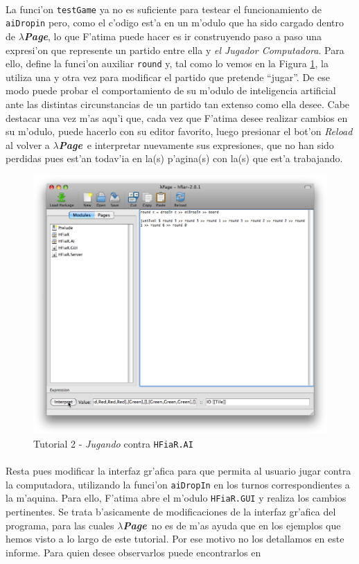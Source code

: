 \documentclass[a4paper]{article}
\newcommand{\hpage}{\textbf{\textsl{$\lambda$Page}}}
\begin{document}
\paragraph{} La funci'on \texttt{testGame} ya no es suficiente para testear el funcionamiento de \texttt{aiDropin} pero, como el c'odigo est'a en un m'odulo que ha sido cargado dentro de \hpage, lo que F'atima puede hacer es ir construyendo paso a paso una expresi'on que represente un partido entre ella y \textsl{el Jugador Computadora}.  Para ello, define la funci'on auxiliar \texttt{round} y, tal como lo vemos en la Figura \ref{tut211}, la utiliza una y otra vez para modificar el partido que pretende ``jugar''.  De ese modo puede probar el comportamiento de su m'odulo de inteligencia artificial ante las distintas circunstancias de un partido tan extenso como ella desee.  Cabe destacar una vez m'as aqu'i que, cada vez que F'atima desee realizar cambios en su m'odulo, puede hacerlo con su editor favorito, luego presionar el bot'on \textsl{Reload} al volver a \hpage\ e interpretar nuevamente sus expresiones, que no han sido perdidas pues est'an todav'ia en la(s) p'agina(s) con la(s) que est'a trabajando.
\begin{figure}[hp]
	\begin{center}
        	\includegraphics[width=.75\textwidth]{pictures/tut2/08}
		\caption{Tutorial 2 - \textsl{Jugando} contra \texttt{HFiaR.AI}}
		\label{tut211}
	\end{center}
\end{figure}
\paragraph{}Resta pues modificar la interfaz gr'afica para que permita al usuario jugar contra la computadora, utilizando la funci'on \texttt{aiDropIn} en los turnos correspondientes a la m'aquina.  Para ello, F'atima abre el m'odulo \texttt{HFiaR.GUI} y realiza los cambios pertinentes.   Se trata b'asicamente de modificaciones de la interfaz gr'afica del programa, para las cuales \hpage\ no es de m'as ayuda que en los ejemplos que hemos visto a lo largo de este tutorial.  Por ese motivo no los detallamos en este informe.  Para quien desee observarlos puede encontrarlos en ~\cite{hfiar}
\end{document}

